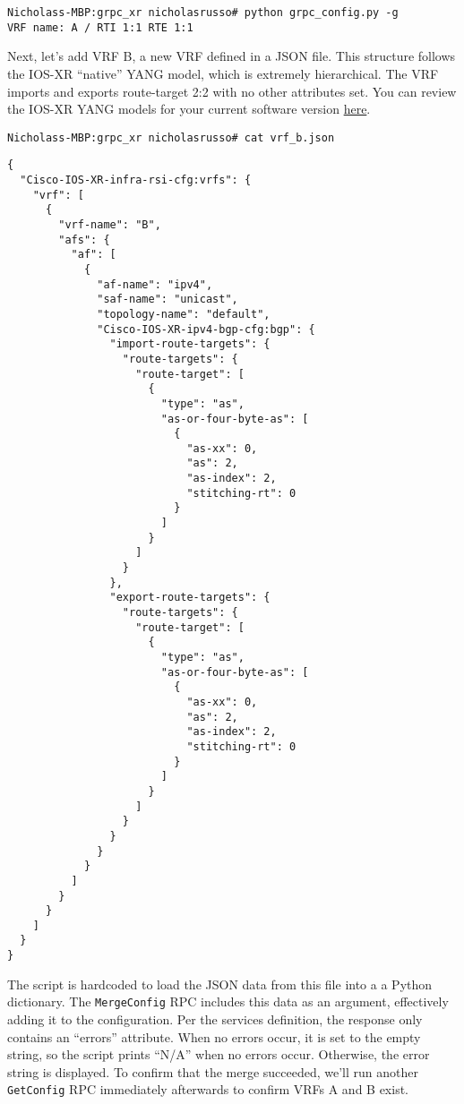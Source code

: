 \begin{verbatim}
Nicholass-MBP:grpc_xr nicholasrusso# python grpc_config.py -g
VRF name: A / RTI 1:1 RTE 1:1
\end{verbatim}

Next, let's add VRF B, a new VRF defined in a JSON file. This structure
follows the IOS-XR ``native'' YANG model, which is extremely hierarchical.
The VRF imports and exports route-target 2:2 with no other attributes set.
You can review the IOS-XR YANG models for your current software version
\href{https://github.com/YangModels/yang/tree/master/vendor/cisco/xr}{here}.

\begin{verbatim}
Nicholass-MBP:grpc_xr nicholasrusso# cat vrf_b.json
\end{verbatim}

\begin{verbatim}
{
  "Cisco-IOS-XR-infra-rsi-cfg:vrfs": {
    "vrf": [
      {
        "vrf-name": "B",
        "afs": {
          "af": [
            {
              "af-name": "ipv4",
              "saf-name": "unicast",
              "topology-name": "default",
              "Cisco-IOS-XR-ipv4-bgp-cfg:bgp": {
                "import-route-targets": {
                  "route-targets": {
                    "route-target": [
                      {
                        "type": "as",
                        "as-or-four-byte-as": [
                          {
                            "as-xx": 0,
                            "as": 2,
                            "as-index": 2,
                            "stitching-rt": 0
                          }
                        ]
                      }
                    ]
                  }
                },
                "export-route-targets": {
                  "route-targets": {
                    "route-target": [
                      {
                        "type": "as",
                        "as-or-four-byte-as": [
                          {
                            "as-xx": 0,
                            "as": 2,
                            "as-index": 2,
                            "stitching-rt": 0
                          }
                        ]
                      }
                    ]
                  }
                }
              }
            }
          ]
        }
      }
    ]
  }
}
\end{verbatim}

The script is hardcoded to load the JSON data from this file into a
a Python dictionary. The \verb|MergeConfig| RPC includes this data as
an argument, effectively adding it to the configuration. Per the
services definition, the response only contains an ``errors'' attribute.
When no errors occur, it is set to the empty string, so the script prints
``N/A'' when no errors occur. Otherwise, the error string is displayed. To
confirm that the merge succeeded, we'll run another \verb|GetConfig| RPC
immediately afterwards to confirm VRFs A and B exist.


